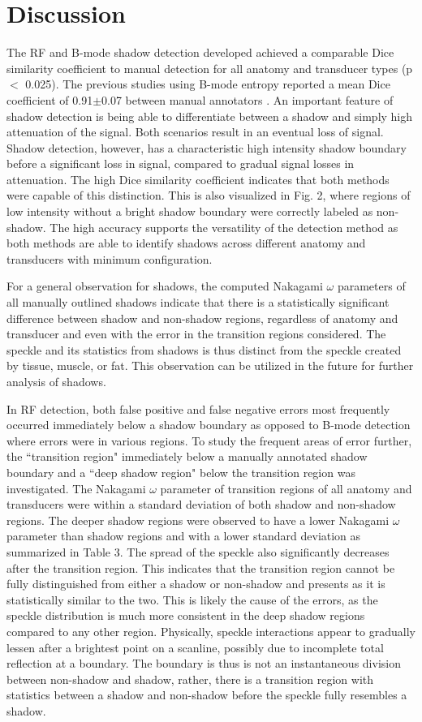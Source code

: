 \documentclass[authoryear,preprint,review,12pt]{elsarticle}
\begin{document}
\section*{Discussion}
\label{Discuss}
The RF and B-mode shadow detection developed achieved a comparable Dice similarity coefficient to manual detection for all anatomy and transducer types (p $<$ 0.025). The previous studies using B-mode entropy reported a mean Dice coefficient of 0.91$\pm$0.07 between manual annotators  \citep{Hellier2010}. An important feature of shadow detection is being able to differentiate between a shadow and simply high attenuation of the signal. Both scenarios result in an eventual loss of signal. Shadow detection, however, has a characteristic high intensity shadow boundary before a significant loss in signal, compared to gradual signal losses in attenuation. The high Dice similarity coefficient indicates that both methods were capable of this distinction. This is also visualized in Fig. 2, where regions of low intensity without a bright shadow boundary were correctly labeled as non-shadow. The high accuracy supports the versatility of the detection method as both methods are able to identify shadows across different anatomy and transducers with minimum configuration. 

For a general observation for shadows, the computed Nakagami $\omega$ parameters of all manually outlined shadows indicate that there is a statistically significant difference between shadow and non-shadow regions, regardless of anatomy and transducer and even with the error in the transition regions considered. The speckle and its statistics from shadows is thus distinct from the speckle created by tissue, muscle, or fat. This observation can be utilized in the future for further analysis of shadows. 

In RF detection, both false positive and false negative errors most frequently occurred immediately below a shadow boundary as opposed to B-mode detection where errors were in various regions. To study the frequent areas of error further, the ``transition region" immediately below a manually annotated shadow boundary and a ``deep shadow region" below the transition region was investigated. The Nakagami $\omega$ parameter of transition regions  of all anatomy and transducers were within a standard deviation of both shadow and non-shadow regions. The deeper shadow regions were observed to have a lower Nakagami $\omega$ parameter than shadow regions and with a lower standard deviation as summarized in Table 3. The spread of the speckle also significantly decreases after the transition region. This indicates that the transition region cannot be fully distinguished from either a shadow or non-shadow and presents as it is statistically similar to the two. This is likely the cause of the errors, as the speckle distribution is much more consistent in the deep shadow regions compared to any other region. Physically, speckle interactions appear to gradually lessen after a brightest point on a scanline, possibly due to incomplete total reflection at a boundary. The boundary is thus is not an instantaneous division between non-shadow and shadow, rather, there is a transition region with statistics between a shadow and non-shadow before the speckle fully resembles a shadow.
\end{document}
